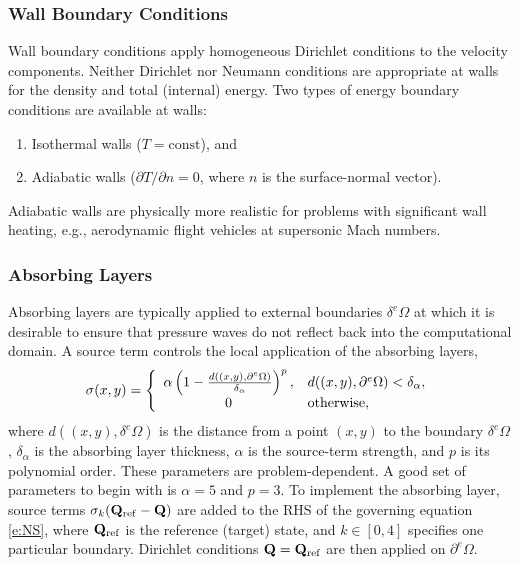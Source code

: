 \documentclass[letterpaper,10pt]{article}
\begin{document}
\subsubsection{Wall Boundary Conditions}
Wall boundary conditions apply homogeneous Dirichlet conditions to the velocity components. Neither Dirichlet nor Neumann conditions are appropriate at walls for the density and total (internal) energy. Two types of energy boundary conditions are available at walls:
\begin{enumerate}
\item Isothermal walls ($T=\mathrm{const}$), and
\item Adiabatic walls ($\partial T/\partial n=0$, where $n$ is the surface-normal vector).
\end{enumerate}
Adiabatic walls are physically more realistic for problems with significant wall heating, e.g., aerodynamic flight vehicles at supersonic Mach numbers.


\subsubsection{Absorbing Layers}
Absorbing layers are typically applied to external boundaries $\delta^e\Omega$ at which it is desirable to ensure that pressure waves do not reflect back into the computational domain. A source term controls the local application of the absorbing layers,
\begin{equation}
  \sigma(x,y) = \left\{ \begin{array}{c l}
    \alpha\left(1 - \frac{d((x,y),\partial^e\Omega)}{\delta_\alpha}\right)^p, & d((x,y),\partial^e\Omega)<\delta_\alpha, \\
    0 & \mathrm{otherwise},
  \end{array} \right.
\end{equation}
where $d((x,y),\delta^e\Omega)$ is the distance from a point $(x,y)$ to the boundary $\delta^e\Omega$, $\delta_\alpha$ is the absorbing layer thickness, $\alpha$ is the source-term strength, and $p$ is its polynomial order. These parameters are problem-dependent. A good set of parameters to begin with is $\alpha=5$ and $p=3$. To implement the absorbing layer, source terms $\sigma_k ({\mathbf{Q}}_\mathrm{ref}-{\mathbf{Q}})$ are added to the RHS of the governing equation \eqref{e:NS}, where ${\mathbf{Q}}_\mathrm{ref}$ is the reference (target) state, and $k\in[0,4]$ specifies one particular boundary. Dirichlet conditions ${\mathbf{Q}}={\mathbf{Q}}_\mathrm{ref}$ are then applied on $\partial^e\Omega$.
\end{document}

